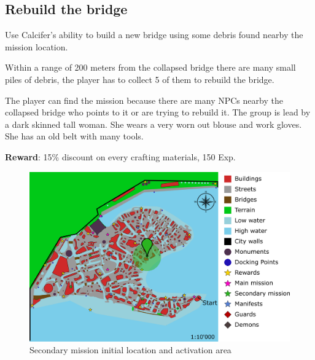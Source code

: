 \subsection{Rebuild the bridge}
Use Calcifer's ability to build a new bridge using some debris found nearby the mission location.

Within a range of 200 meters from the collapsed bridge there are many small piles of debris, the player has to collect 5 of them to rebuild the bridge.

The player can find the mission because there are many NPCs nearby the collapsed bridge who points to it or are trying to rebuild it. The group is lead by a dark skinned tall woman. She wears a very worn out blouse and work gloves. She has an old belt with many tools.

\textbf{Reward}: 15\% discount on every crafting materials, 150 Exp.

\begin{figure}[H]
  \centering
  \includegraphics[width=\textwidth]{../Images/Maps/dynamiaSecondaryMissions_Bridge}
  \caption{Secondary mission initial location and activation area}
\end{figure}

